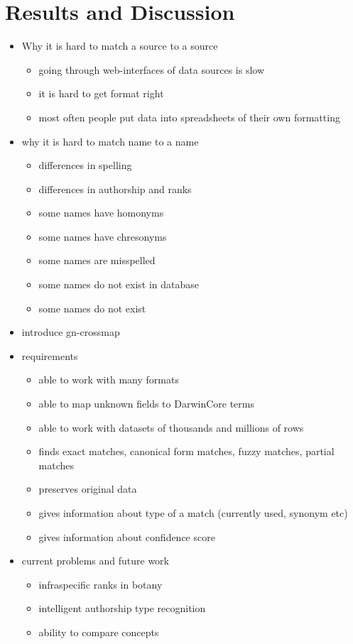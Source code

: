 \documentclass{bmcart}
\begin{document}
\section*{Results and Discussion}
\begin{itemize}
  \item Why it is hard to match a source to a source
    \begin{itemize}
      \item going through web-interfaces of data sources is slow
      \item it is hard to get format right
      \item most often people put data into spreadsheets of their own
        formatting
    \end{itemize}
  \item why it is hard to match name to a name
    \begin{itemize}
      \item differences in spelling
      \item differences in authorship and ranks
      \item some names have homonyms
      \item some names have chresonyms
      \item some names are misspelled
      \item some names do not exist in database
      \item some names do not exist
    \end{itemize}
  \item introduce gn-crossmap
  \item requirements
    \begin{itemize}
      \item able to work with many formats
      \item able to map unknown fields to DarwinCore terms
      \item able to work with datasets of thousands and millions of rows
      \item finds exact matches, canonical form matches, fuzzy matches, partial
        matches
      \item preserves original data
      \item gives information about type of a match (currently used, synonym
        etc)
      \item gives information about confidence score
    \end{itemize}
  \item current problems and future work
    \begin{itemize}
      \item infraspecific ranks in botany
      \item intelligent authorship type recognition
      \item ability to compare concepts
    \end{itemize}
\end{itemize}
\end{document}

